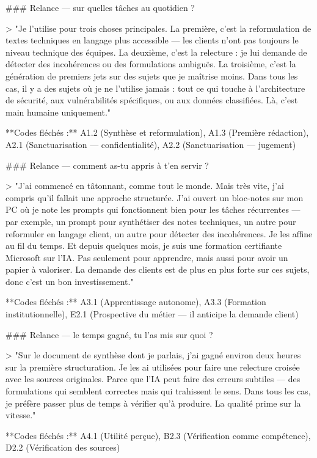 ### Relance — sur quelles tâches au quotidien ?

> "Je l'utilise pour trois choses principales. La première, c'est la reformulation de textes techniques en langage plus accessible — les clients n'ont pas toujours le niveau technique des équipes. La deuxième, c'est la relecture : je lui demande de détecter des incohérences ou des formulations ambiguës. La troisième, c'est la génération de premiers jets sur des sujets que je maîtrise moins. Dans tous les cas, il y a des sujets où je ne l'utilise jamais : tout ce qui touche à l'architecture de sécurité, aux vulnérabilités spécifiques, ou aux données classifiées. Là, c'est main humaine uniquement."

**Codes fléchés :** A1.2 (Synthèse et reformulation), A1.3 (Première rédaction), A2.1 (Sanctuarisation — confidentialité), A2.2 (Sanctuarisation — jugement)

### Relance — comment as-tu appris à t'en servir ?

> "J'ai commencé en tâtonnant, comme tout le monde. Mais très vite, j'ai compris qu'il fallait une approche structurée. J'ai ouvert un bloc-notes sur mon PC où je note les prompts qui fonctionnent bien pour les tâches récurrentes — par exemple, un prompt pour synthétiser des notes techniques, un autre pour reformuler en langage client, un autre pour détecter des incohérences. Je les affine au fil du temps. Et depuis quelques mois, je suis une formation certifiante Microsoft sur l'IA. Pas seulement pour apprendre, mais aussi pour avoir un papier à valoriser. La demande des clients est de plus en plus forte sur ces sujets, donc c'est un bon investissement."

**Codes fléchés :** A3.1 (Apprentissage autonome), A3.3 (Formation institutionnelle), E2.1 (Prospective du métier — il anticipe la demande client)

### Relance — le temps gagné, tu l'as mis sur quoi ?

> "Sur le document de synthèse dont je parlais, j'ai gagné environ deux heures sur la première structuration. Je les ai utilisées pour faire une relecture croisée avec les sources originales. Parce que l'IA peut faire des erreurs subtiles — des formulations qui semblent correctes mais qui trahissent le sens. Dans tous les cas, je préfère passer plus de temps à vérifier qu'à produire. La qualité prime sur la vitesse."

**Codes fléchés :** A4.1 (Utilité perçue), B2.3 (Vérification comme compétence), D2.2 (Vérification des sources)

